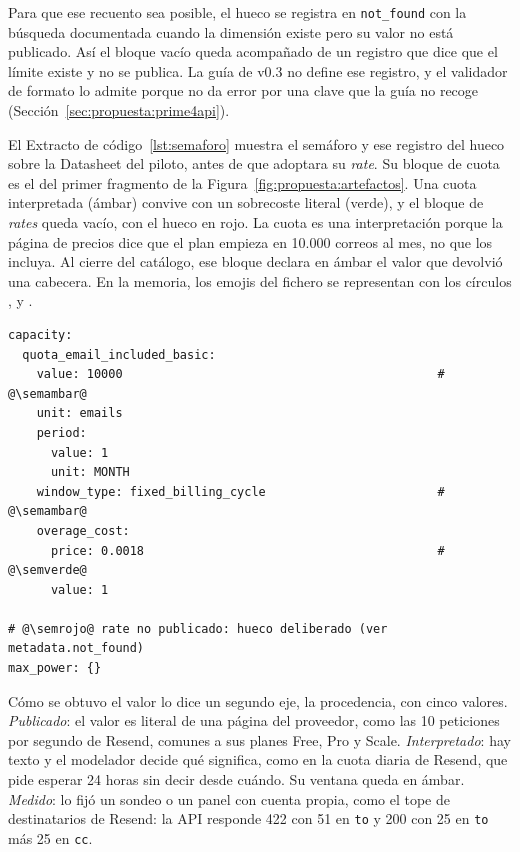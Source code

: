 Para que ese recuento sea posible, el hueco se registra en \texttt{not\_found} con la búsqueda documentada cuando la dimensión existe pero su valor no está publicado.
Así el bloque vacío queda acompañado de un registro que dice que el límite existe y no se publica.
La guía de v0.3 no define ese registro, y el validador de formato lo admite porque no da error por una clave que la guía no recoge (Sección~\ref{sec:propuesta:prime4api}).

El Extracto de código~\ref{lst:semaforo} muestra el semáforo y ese registro del hueco sobre la Datasheet del piloto, antes de que adoptara su \textit{rate}.
Su bloque de cuota es el del primer fragmento de la Figura~\ref{fig:propuesta:artefactos}.
Una cuota interpretada (ámbar) convive con un sobrecoste literal (verde), y el bloque de \textit{rates} queda vacío, con el hueco en rojo.
La cuota es una interpretación porque la página de precios dice que el plan empieza en 10.000 correos al mes, no que los incluya.
Al cierre del catálogo, ese bloque declara en ámbar el valor que devolvió una cabecera.
En la memoria, los emojis del fichero se representan con los círculos \semverde{}, \semambar{} y \semrojo{}.

\begin{lstlisting}[style=datasheetyaml,
caption={Serialización del semáforo de confianza en la Datasheet del
piloto (fragmento).},
label=lst:semaforo]
capacity:
  quota_email_included_basic:
    value: 10000                                            # @\semambar@
    unit: emails
    period:
      value: 1
      unit: MONTH
    window_type: fixed_billing_cycle                        # @\semambar@
    overage_cost:
      price: 0.0018                                         # @\semverde@
      value: 1

# @\semrojo@ rate no publicado: hueco deliberado (ver metadata.not_found)
max_power: {}
\end{lstlisting}

Cómo se obtuvo el valor lo dice un segundo eje, la procedencia, con cinco valores.
\textit{Publicado}: el valor es literal de una página del proveedor, como las 10 peticiones por segundo de Resend, comunes a sus planes Free, Pro y Scale.
\textit{Interpretado}: hay texto y el modelador decide qué significa, como en la cuota diaria de Resend, que pide esperar 24 horas sin decir desde cuándo.
Su ventana queda en ámbar.
\textit{Medido}: lo fijó un sondeo o un panel con cuenta propia, como el tope de destinatarios de Resend: la API responde 422 con 51 en \texttt{to} y 200 con 25 en \texttt{to} más 25 en \texttt{cc}.

